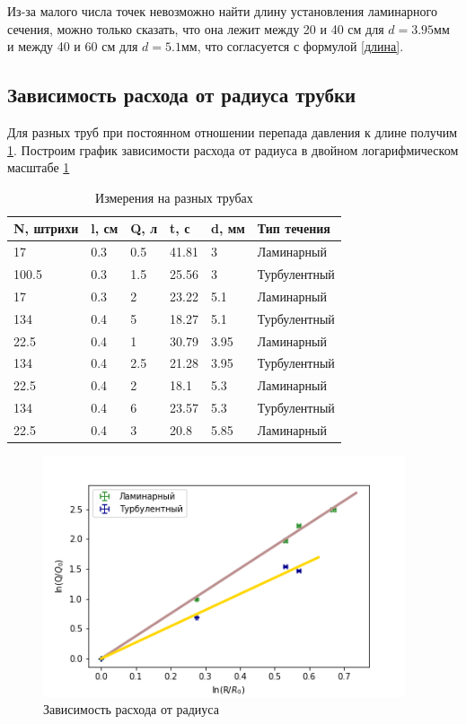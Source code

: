\documentclass[a4paper,12pt]{article} %
\begin{document}
Из-за малого числа точек невозможно найти длину установления ламинарного сечения, можно только сказать, что она лежит между 20 и 40 см для $d = 3.95 мм$ и между 40 и 60 см для $d =5.1 мм$, что согласуется с формулой \ref{длина}.

\subsection{Зависимость расхода от радиуса трубки}
Для разных труб при постоянном отношении перепада давления к длине получим \ref{трубы}. Построим график зависимости расхода от радиуса в двойном логарифмическом масштабе \ref{Q(R)}

\begin{table}[h!]
\caption{Измерения на разных трубах}
\label{трубы}
\begin{tabular}{|l|l|l|l|l|l|}
\hline
N, штрихи & l, см & Q, л & t, с  & d, мм & Тип течения  \\ \hline
17        & 0.3   & 0.5  & 41.81 & 3     & Ламинарный   \\ \hline
100.5     & 0.3   & 1.5  & 25.56 & 3     & Турбулентный \\ \hline
17        & 0.3   & 2    & 23.22 & 5.1   & Ламинарный   \\ \hline
134       & 0.4   & 5    & 18.27 & 5.1   & Турбулентный \\ \hline
22.5      & 0.4   & 1    & 30.79 & 3.95  & Ламинарный   \\ \hline
134       & 0.4   & 2.5  & 21.28 & 3.95  & Турбулентный \\ \hline
22.5      & 0.4   & 2    & 18.1  & 5.3   & Ламинарный   \\ \hline
134       & 0.4   & 6    & 23.57 & 5.3   & Турбулентный \\ \hline
22.5      & 0.4   & 3    & 20.8  & 5.85  & Ламинарный   \\ \hline
\end{tabular}
\end{table}

\begin{figure}[h!]
\begin{center}
\includegraphics[width=0.95\textwidth]{Q(R)}
\end{center}
\caption{Зависимость расхода от радиуса} \label{Q(R)}
\end{figure}
\end{document}
